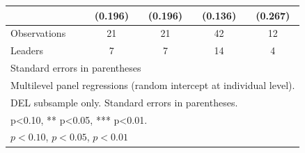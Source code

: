 \begin{table}[htbp]
\begin{tabular}{l*{4}{c}}
            &     (0.196)         &     (0.196)         &     (0.136)         &     (0.267)         \\
\midrule
Observations&          21         &          21         &          42         &          12         \\
Leaders     &           7         &           7         &          14         &           4         \\
\bottomrule
\multicolumn{5}{l}{\footnotesize Standard errors in parentheses}\\
\multicolumn{5}{l}{\footnotesize Multilevel panel regressions (random intercept at individual level).}\\
\multicolumn{5}{l}{\footnotesize DEL subsample only. Standard errors in parentheses.}\\
\multicolumn{5}{l}{\footnotesize * p<0.10, ** p<0.05, *** p<0.01.}\\
\multicolumn{5}{l}{\footnotesize \sym{*} \(p<0.10\), \sym{**} \(p<0.05\), \sym{***} \(p<0.01\)}\\
\end{tabular}
\end{table}
